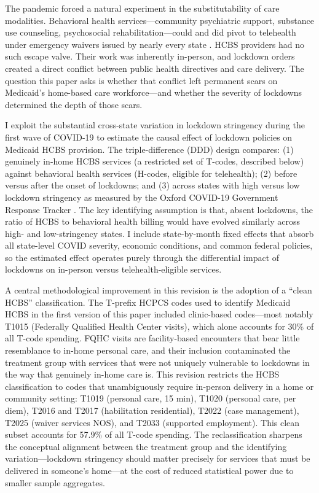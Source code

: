 \documentclass[12pt]{article}
\begin{document}
The pandemic forced a natural experiment in the substitutability of care modalities. Behavioral health services---community psychiatric support, substance use counseling, psychosocial rehabilitation---could and did pivot to telehealth under emergency waivers issued by nearly every state \citep{cms2020telehealth}. HCBS providers had no such escape valve. Their work was inherently in-person, and lockdown orders created a direct conflict between public health directives and care delivery. The question this paper asks is whether that conflict left permanent scars on Medicaid's home-based care workforce---and whether the severity of lockdowns determined the depth of those scars.

I exploit the substantial cross-state variation in lockdown stringency during the first wave of COVID-19 to estimate the causal effect of lockdown policies on Medicaid HCBS provision. The triple-difference (DDD) design compares: (1) genuinely in-home HCBS services (a restricted set of T-codes, described below) against behavioral health services (H-codes, eligible for telehealth); (2) before versus after the onset of lockdowns; and (3) across states with high versus low lockdown stringency as measured by the Oxford COVID-19 Government Response Tracker \citep{hale2021global}. The key identifying assumption is that, absent lockdowns, the ratio of HCBS to behavioral health billing would have evolved similarly across high- and low-stringency states. I include state-by-month fixed effects that absorb all state-level COVID severity, economic conditions, and common federal policies, so the estimated effect operates purely through the differential impact of lockdowns on in-person versus telehealth-eligible services.

A central methodological improvement in this revision is the adoption of a ``clean HCBS'' classification. The T-prefix HCPCS codes used to identify Medicaid HCBS in the first version of this paper included clinic-based codes---most notably T1015 (Federally Qualified Health Center visits), which alone accounts for 30\% of all T-code spending. FQHC visits are facility-based encounters that bear little resemblance to in-home personal care, and their inclusion contaminated the treatment group with services that were not uniquely vulnerable to lockdowns in the way that genuinely in-home care is. This revision restricts the HCBS classification to codes that unambiguously require in-person delivery in a home or community setting: T1019 (personal care, 15 min), T1020 (personal care, per diem), T2016 and T2017 (habilitation residential), T2022 (case management), T2025 (waiver services NOS), and T2033 (supported employment). This clean subset accounts for 57.9\% of all T-code spending. The reclassification sharpens the conceptual alignment between the treatment group and the identifying variation---lockdown stringency should matter precisely for services that must be delivered in someone's home---at the cost of reduced statistical power due to smaller sample aggregates.
\end{document}
